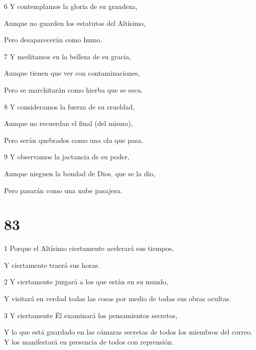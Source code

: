 \par 6 Y contemplamos la gloria de su grandeza,

\par Aunque no guarden los estatutos del Altísimo,

\par Pero desaparecerán como humo.

\par 7 Y meditamos en la belleza de su gracia,

\par Aunque tienen que ver con contaminaciones,

\par Pero se marchitarán como hierba que se seca.

\par 8 Y consideramos la fuerza de su crueldad,

\par Aunque no recuerdan el final (del mismo),

\par Pero serán quebrados como una ola que pasa.

\par 9 Y observamos la jactancia de su poder,

\par Aunque nieguen la bondad de Dios, que se la dio,

\par Pero pasarán como una nube pasajera.

\chapter{83}

\par 1 Porque el Altísimo ciertamente acelerará sus tiempos,

\par Y ciertamente traerá sus horas.

\par 2 Y ciertamente juzgará a los que están en su mundo,

\par Y visitará en verdad todas las cosas por medio de todas sus obras ocultas.

\par 3 Y ciertamente Él examinará los pensamientos secretos,

\par Y lo que está guardado en las cámaras secretas de todos los miembros del correo. Y los manifestará en presencia de todos con reprensión.

